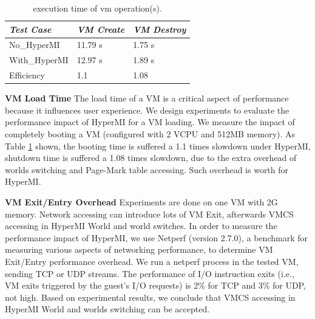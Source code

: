 \documentclass[conference]{IEEEtran}
\begin{document}
\begin{table}
\centering
\caption{execution time of vm operation(s).}\label{tabvm}
\begin{tabular}{p{2cm}|p{1.4cm}|p{1.5cm}}
\hline
{\itshape\bfseries  Test Case} & {\itshape\bfseries VM Create} & {\itshape\bfseries VM Destroy} \\
\hline
No\_HyperMI & 11.79 s &  1.75 s\\
\hline
With\_HyperMI & 12.97 s & 1.89 s\\ 
\hline
Efficiency & 1.1 & 1.08 \\
\hline
\end{tabular}
\end{table}


\textbf {VM Load Time}
The load time of a VM is a critical aspect of performance because it influences user experience. We design experiments to evaluate the performance impact of HyperMI for a VM loading.
 We measure the impact of completely booting a VM (configured with 2 VCPU and 512MB memory). As Table \ref{tabvm} shown, the booting time is suffered a 1.1 times slowdown under HyperMI, shutdown time is suffered a 1.08 times slowdown, due to the extra overhead of worlds switching and Page-Mark table accessing. Such overhead is worth for HyperMI.


\iffalse
\textbf {VM Exit/Entry Overhead}
Experiments are done on one VM with 2G memory. Network accessing can introduce lots of VM Exit, afterwards VMCS accessing in HyperMI World and world switches. In order to measure the performance impact of HyperMI, we use Netperf (version 2.7.0), a benchmark for measuring various aspects of networking performance, to determine VM Exit/Entry performance overhead. We run a netperf process in the tested VM, sending TCP or UDP streams. The performance of I/O instruction exits (i.e., VM exits triggered by the guest's I/O requests) is 2\% for TCP and 3\% for UDP, not high. 
Based on experimental results, we conclude that VMCS accessing in HyperMI World and worlds switching can be accepted.
\end{document}
